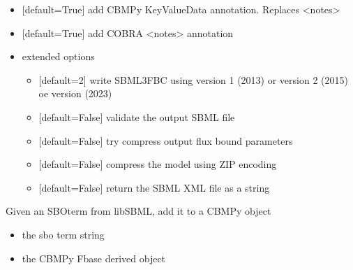 \documentclass[letterpaper,10pt,english]{sphinxmanual}
\begin{document}
\begin{fulllineitems}
\begin{itemize}
\item {} 
\sphinxAtStartPar
{} {[}default=True{]} add CBMPy KeyValueData annotation. Replaces \textless{}notes\textgreater{}

\item {} 
\sphinxAtStartPar
{} {[}default=True{]} add COBRA \textless{}notes\textgreater{} annotation

\item {} 
\sphinxAtStartPar
{} extended options
\begin{itemize}
\item {} 
\sphinxAtStartPar
{} {[}default=2{]} write SBML3FBC using version 1 (2013) or version 2 (2015) oe version (2023)

\item {} 
\sphinxAtStartPar
{} {[}default=False{]} validate the output SBML file

\item {} 
\sphinxAtStartPar
{} {[}default=False{]} try compress output flux bound parameters

\item {} 
\sphinxAtStartPar
{} {[}default=False{]} compress the model using ZIP encoding

\item {} 
\sphinxAtStartPar
{} {[}default=False{]} return the SBML XML file as a string

\end{itemize}

\end{itemize}

\end{fulllineitems}


\begin{fulllineitems}
\label{\detokenize{modules_doc:cbmpy.CBXML.setCBSBOterm}}
\pysigstartsignatures
{}
\pysigstopsignatures
\sphinxAtStartPar
Given an SBOterm from libSBML, add it to a CBMPy object
\begin{itemize}
\item {} 
\sphinxAtStartPar
{} the sbo term string

\item {} 
\sphinxAtStartPar
{} the CBMPy Fbase derived object

\end{itemize}

\end{fulllineitems}
\end{document}
